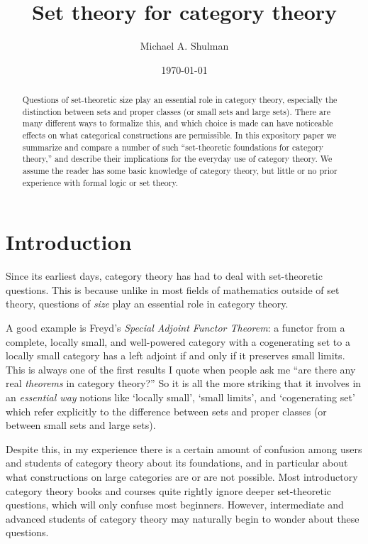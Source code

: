 \documentclass[12pt]{amsart}
\title{Set theory for category theory}
\author{Michael A. Shulman}
\date{\today}
\begin{document}
\maketitle

\begin{abstract}
  Questions of set-theoretic size play an essential role in category
  theory, especially the distinction between sets and proper classes
  (or small sets and large sets).  There are many different ways to
  formalize this, and which choice is made can have noticeable effects
  on what categorical constructions are permissible.  In this
  expository paper we summarize and compare a number of such
  ``set-theoretic foundations for category theory,'' and describe their
  implications for the everyday use of category theory.  We assume the
  reader has some basic knowledge of category theory, but little or no
  prior experience with formal logic or set theory.
\end{abstract}

\section{Introduction}
\label{sec:introduction}

Since its earliest days, category theory has had to deal with
set-theoretic questions.  This is because unlike in most fields of
mathematics outside of set theory, questions of \emph{size} play an
essential role in category theory.

A good example is Freyd's \emph{Special Adjoint Functor Theorem}: a
functor from a complete, locally small, and well-powered category with
a cogenerating set to a locally small category has a left adjoint if
and only if it preserves small limits.  This is always one of the
first results I quote when people ask me ``are there any real
\emph{theorems} in category theory?''  So it is all the more striking
that it involves in an \emph{essential way} notions like `locally
small', `small limits', and `cogenerating set' which refer explicitly
to the difference between sets and proper classes (or between small
sets and large sets).

Despite this, in my experience there is a certain amount of confusion
among users and students of category theory about its foundations, and
in particular about what constructions on large categories are or are
not possible.  Most introductory category theory books and courses
quite rightly ignore deeper set-theoretic questions, which will only
confuse most beginners.  However, intermediate and advanced students
of category theory may naturally begin to wonder about these
questions.
\end{document}
